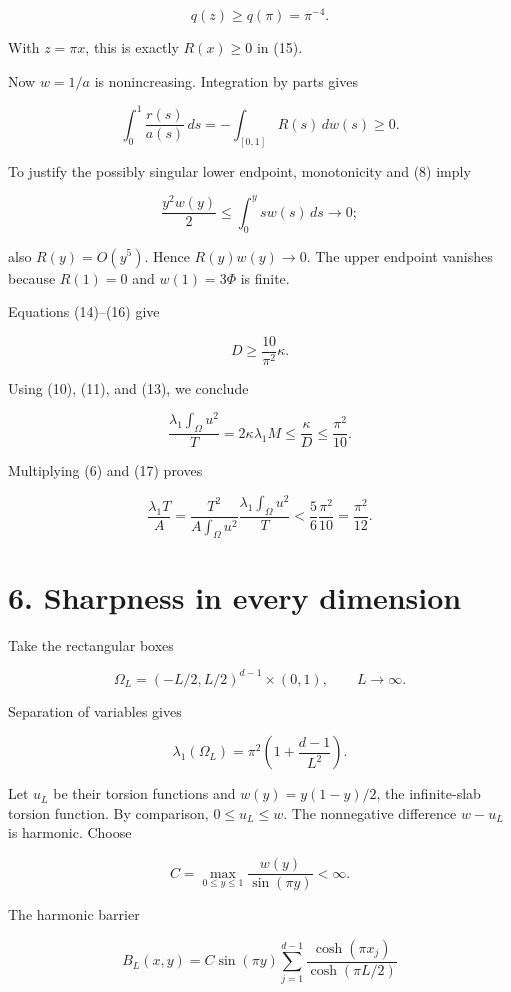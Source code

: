 \documentclass[11pt,a4paper]{article}
\begin{document}
\[
 q(z)\ge q(\pi)=\pi^{-4}.
\]

With \(z=\pi x\), this is exactly \(R(x)\ge 0\) in (15).

Now \(w=1/a\) is nonincreasing. Integration by parts gives

\[
 \int_0^1\frac{r(s)}{a(s)}\,ds
  =-\int_{[0,1]}R(s)\,dw(s)\ge0.
 \tag{16}
\]

To justify the possibly singular lower endpoint, monotonicity and (8)
imply

\[
 \frac{y^2w(y)}2\le\int_0^y sw(s)\,ds\longrightarrow0;
\]

also \(R(y)=O(y^5)\). Hence \(R(y)w(y)\to 0\). The upper endpoint
vanishes because \(R(1)=0\) and \(w(1)=3\Phi\) is finite.

Equations (14)--(16) give

\[
 D\ge\frac{10}{\pi^2}\kappa.
\]

Using (10), (11), and (13), we conclude

\[
 \boxed{\frac{\lambda_1\int_\Omega u^2}{T}
       =2\kappa\lambda_1M
       \le\frac{\kappa}{D}\le\frac{\pi^2}{10}.}
 \tag{17}
\]

Multiplying (6) and (17) proves

\[
 \frac{\lambda_1T}{A}
  =\frac{T^2}{A\int_\Omega u^2}
      \frac{\lambda_1\int_\Omega u^2}{T}
  <\frac56\frac{\pi^2}{10}=\frac{\pi^2}{12}.
\]

\hypertarget{1028-sharpness-in-every-dimension}{%
\section{6. Sharpness in every
dimension}\label{1028-sharpness-in-every-dimension}}

Take the rectangular boxes

\[
 \Omega_L=(-L/2,L/2)^{d-1}\times(0,1),\qquad L\to\infty.
\]

Separation of variables gives

\[
 \lambda_1(\Omega_L)=\pi^2\left(1+\frac{d-1}{L^2}\right).
\]

Let \(u_L\) be their torsion functions and \(w(y)=y(1-y)/2\), the
infinite-slab torsion function. By comparison, \(0\le u_L\le w\). The
nonnegative difference \(w-u_L\) is harmonic. Choose

\[
 C=\max_{0\le y\le1}\frac{w(y)}{\sin(\pi y)}<\infty.
\]

The harmonic barrier

\[
 B_L(x,y)=C\sin(\pi y)
     \sum_{j=1}^{d-1}\frac{\cosh(\pi x_j)}{\cosh(\pi L/2)}
\]
\end{document}
